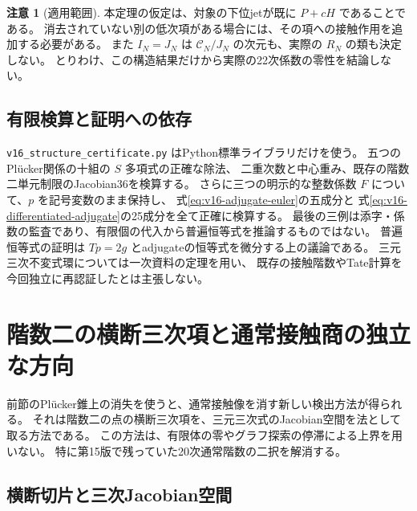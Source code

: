 \documentclass[a4paper,11pt]{ltjsarticle}
\theoremstyle{definition}
\newtheorem{remark}[theorem]{注意}
\begin{document}
\begin{remark}[適用範囲]
本定理の仮定は、対象の下位jetが既に $P+cH$ であることである。
消去されていない別の低次項がある場合には、その項への接触作用を追加する必要がある。
また $I_N=J_N$ は $\mathcal C_N/J_N$ の次元も、実際の $R_N$ の類も決定しない。
とりわけ、この構造結果だけから実際の22次係数の零性を結論しない。
\end{remark}

\subsection{有限検算と証明への依存}

\nolinkurl{v16_structure_certificate.py} はPython標準ライブラリだけを使う。
五つのPl\"ucker関係の十組の $S$ 多項式の正確な除法、
二重次数と中心重み、既存の階数二単元制限のJacobian36を検算する。
さらに三つの明示的な整数係数 $F$ について、$p$ を記号変数のまま保持し、
式\eqref{eq:v16-adjugate-euler}の五成分と
式\eqref{eq:v16-differentiated-adjugate}の25成分を全て正確に検算する。
最後の三例は添字・係数の監査であり、有限個の代入から普遍恒等式を推論するものではない。
普遍恒等式の証明は $Tp=2g$ とadjugateの恒等式を微分する上の議論である。
三元三次不変式環については一次資料の定理を用い、
既存の接触階数やTate計算を今回独立に再認証したとは主張しない。




\section{階数二の横断三次項と通常接触商の独立な方向}
\label{sec:v16-normal-slice-injection}

前節のPl\"ucker錐上の消失を使うと、通常接触像を消す新しい検出方法が得られる。
それは階数二の点の横断三次項を、三元三次式のJacobian空間を法として取る方法である。
この方法は、有限体の零やグラフ探索の停滞による上界を用いない。
特に第15版で残っていた20次通常階数の二択を解消する。

\subsection{横断切片と三次Jacobian空間}
\end{document}
